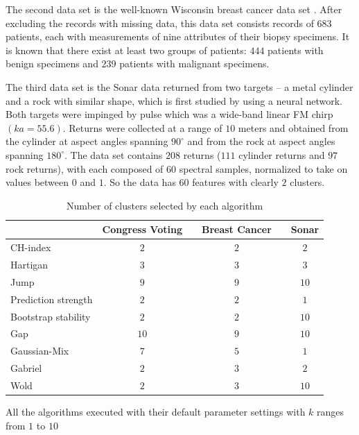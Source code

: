 \documentclass[12pt]{article}
\begin{document}
The second data set is the well-known Wisconsin breast cancer data set \citep{mangasarian1990pattern}. After excluding the records with missing data, this data set consists records of $683$ patients, each with measurements of nine attributes of their biopsy specimens. It is known that there exist at least two groups of patients: $444$ patients with benign specimens and $239$ patients with malignant specimens.

The third data set is the Sonar data returned from two targets -- a metal
cylinder and a rock with similar shape, which is first studied by
\cite{gorman1988analysis} using a neural network. Both targets were impinged
by pulse which was a wide-band linear FM chirp $(ka = 55.6)$. Returns were
collected at a range of $10$ meters and obtained from the cylinder at aspect
angles spanning $90^{\circ}$ and from the rock at aspect angles spanning
$180^{\circ}$. The data set contains $208$ returns ($111$ cylinder returns and
$97$ rock returns), with each composed of $60$ spectral samples, normalized to
take on values between $0$ and $1$. So the data has $60$ features with clearly
$2$ clusters. 

\begin{table}[H]
\begin{center}
\captionsetup{justification=centering}
\caption{\label{table2} Number of clusters selected by each algorithm}
\begin{tabular}{lccccc}
    \hline                  
 & Congress Voting && Breast Cancer && Sonar \\ \hline                    
CH-index & $2$ && $2$  && $2$    \\
Hartigan & $3$ && $3$  &&  $3$   \\
Jump & $9$ && $9$ && $10$  \\   
Prediction strength & $2$ &&  $2$ && $1$    \\
Bootstrap stability & $2$ &&  $2$ &&  $10$   \\ 
Gap & $10$ && $9$ && $10$  \\   
Gaussian-Mix & $7$ && $5$ && $1$  \\   
Gabriel & $2$  && $3$  && $2$  \\    
Wold & $2$ && $3$ && $10$ \\  \hline 
\end{tabular}
\end{center}
\hspace{0.5in} \footnotesize {All the algorithms executed with their default parameter settings with $k$ ranges from $1$ to $10$}
\end{table} 
\end{document}
